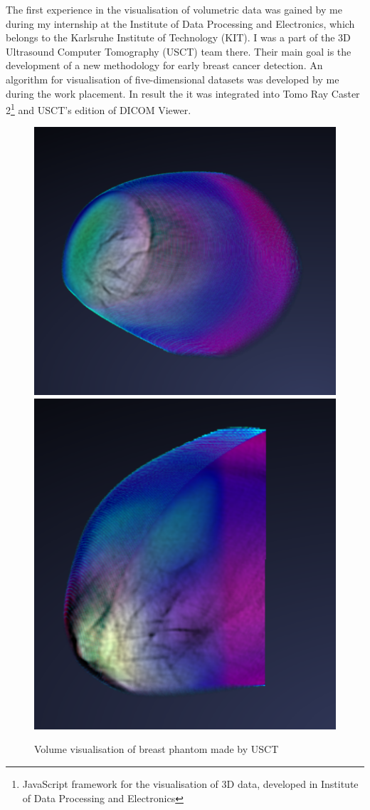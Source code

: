\documentclass[twoside, english, 11pt]{report}
\begin{document}
The first experience in the visualisation of volumetric data was gained by me during my internship at the Institute of Data Processing and Electronics, which belongs to the Karlsruhe Institute of Technology (KIT). I was a part of the 3D Ultrasound Computer Tomography (USCT) team there. Their main goal is the development of a new methodology for early breast cancer detection. An algorithm for visualisation of five-dimensional datasets was developed by me during the work placement. In result the it was integrated into Tomo Ray Caster 2\footnote{JavaScript framework for the visualisation of 3D data, developed in Institute of Data Processing and Electronics} and USCT's edition of DICOM Viewer.\\

\begin{figure}[!h]
\includegraphics[scale=0.4]{img/usct1}\includegraphics[scale=0.4335]{img/usct2}\\
\caption{Volume visualisation of breast phantom made by USCT}
\end{figure}
\end{document}
